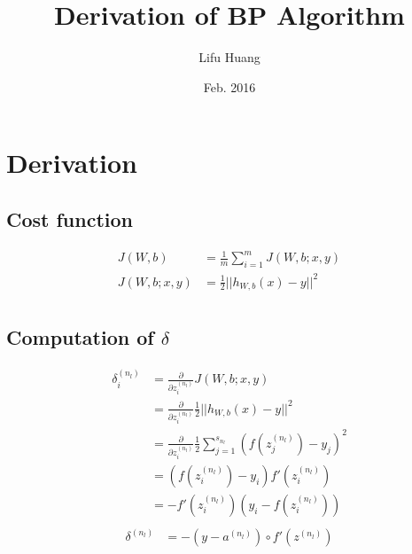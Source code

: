 \documentclass{article}
\title{Derivation of BP Algorithm}
\author{Lifu Huang}
\date{Feb. 2016}
\begin{document}
	\maketitle
	\section{Derivation}
	\subsection{Cost function}
	\begin{equation}
		\begin{aligned}
			J(W, b) &= \frac{1}{m} \sum_{i=1}^{m} J(W, b; x, y)\\
			J(W, b; x, y) &= \frac{1}{2} ||h_{W,b}(x) - y||^2\\
		\end {aligned}
	\end{equation}
	\subsection{Computation of $\delta$}
	\begin{equation}
		\begin{aligned}
			\delta_i^{(n_l)} &= \frac{\partial}{\partial z_i^{(n_l)}} J(W, b; x, y) \\
			&= \frac{\partial}{\partial z_i^{(n_l)}} \frac{1}{2} ||h_{W,b}(x) - y||^2\\
			&= \frac{\partial}{\partial z_i^{(n_l)}} \frac{1}{2} \sum_{j=1}^{s_{n_l}} (f(z_j^{(n_l)}) - y_j)^2 \\
			&= (f(z_i^{(n_l)}) - y_i) f'(z_i^{(n_l)}) \\
			&= -f'(z_i^{(n_l)}) (y_i - f(z_i^{(n_l)})) \\
		\end{aligned}
	\end{equation}
	\begin{equation}
		\begin{aligned}
			\delta^{(n_l)} &= - (y - a^{(n_l)}) \circ f'(z^{(n_l)}) 
		\end{aligned}
	\end{equation}
\end{document}

